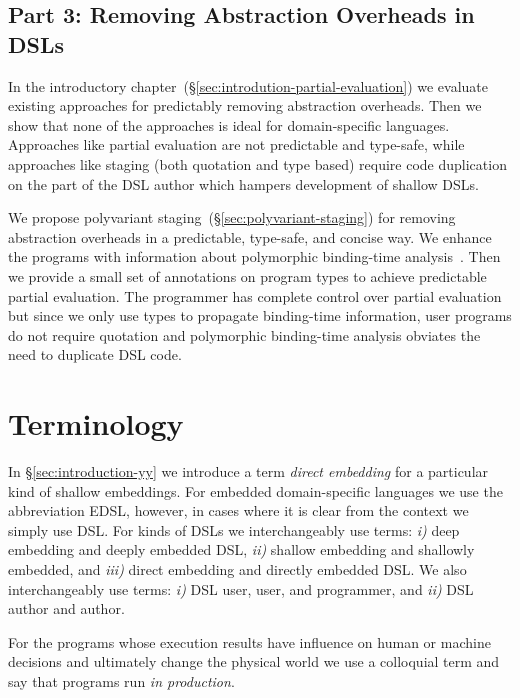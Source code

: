 \subsection{Part 3: Removing Abstraction Overheads in DSLs}
\label{sec:removing-abstraction-overheads}
 In the introductory chapter~(\S \ref{sec:introdution-partial-evaluation}) we evaluate
  existing approaches for predictably removing abstraction overheads. Then we show that none of
  the approaches is ideal for domain-specific languages. Approaches like partial evaluation
  are not predictable and type-safe, while approaches like staging (both quotation and type based)
  require code duplication on the part of the DSL author which hampers development of shallow DSLs.

We propose polyvariant staging~(\S \ref{sec:polyvariant-staging}) for removing abstraction
 overheads in a predictable, type-safe, and concise way. We enhance the programs with
 information about polymorphic binding-time analysis~\cite{rytz1992polyvariant}. Then we provide
 a small set of annotations on program types to achieve predictable partial evaluation.
 The programmer has complete control over partial evaluation but since we only use types to propagate binding-time information, user programs do not require quotation and polymorphic binding-time analysis obviates the need to duplicate DSL code.

\section{Terminology}
\label{sec:terminology}

In \S \ref{sec:introduction-yy} we introduce a term \emph{direct embedding} for a particular kind of
shallow embeddings. For embedded domain-specific languages we use the abbreviation EDSL, however,
in cases where it is clear from the context we simply use DSL. For kinds of DSLs
we interchangeably use terms: \emph{i)} deep embedding and deeply embedded DSL,
\emph{ii)} shallow embedding and shallowly embedded, and \emph{iii)} direct embedding
 and directly embedded DSL. We also interchangeably use terms: \emph{i)} DSL user, user, and programmer, and \emph{ii)}
 DSL author and author.

For the programs whose execution results have influence on human or machine decisions and
 ultimately change the physical world we use a colloquial term and say that programs
 run \emph{in production}.








